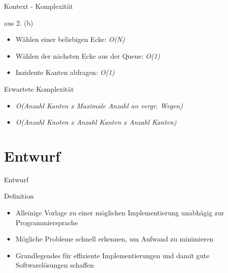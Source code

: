 \documentclass{beamer}
\begin{document}
    \begin{frame}{Kontext - Komplexit\"at}
        \begin{block}{aus 2. (b)}
            \begin{itemize}
                \item W\"ahlen einer beliebigen Ecke: \textit{O(N)}
                \item W\"ahlen der n\"achsten Ecke aus der Queue: \textit{O(1)}
                \item Inzidente Kanten abfragen: \textit{O(1)}
            \end{itemize}
        \end{block}

        \begin{block}{Erwartete Komplexit\"at}
            \begin{itemize}
                \item \textit{O(Anzahl Kanten x Maximale Anzahl an vergr. Wegen)}
                \item \textit{O(Anzahl Knoten x Anzahl Kanten x Anzahl Kanten)}
            \end{itemize}
        \end{block}
    \end{frame}

    \section{Entwurf}
    \begin{frame}{Entwurf}
        \begin{block}{Definition}
            \begin{itemize}
                \item Alleinige Vorlage zu einer m\"oglichen Implementierung unabh\"agig zur Programmiersprache
                \item M\"ogliche Probleme schnell erkennen, um Aufwand zu minimieren
                \item Grundlegendes f\"ur effiziente Implementierungen und damit gute Softwarel\"osungen schaffen
            \end{itemize}
        \end{block}
    \end{frame}
\end{document}

